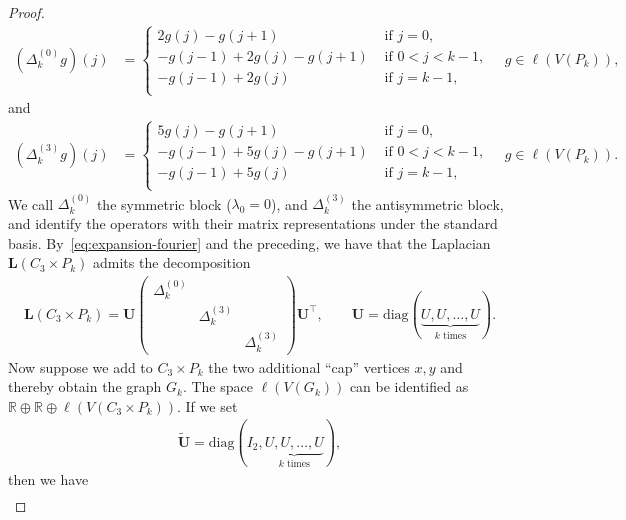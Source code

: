 \documentclass[11pt,a4paper]{amsart}
\begin{document}
\begin{proof}
\begin{align*}
            (\Delta_k^{(0)}g)(j) &= \begin{cases}
                2g(j)-g(j+1) & \text{ if }j=0,\\
                -g(j-1)+2g(j)-g(j+1) & \text{ if }0<j<k-1,\\
                -g(j-1) + 2g(j) & \text{ if }j=k-1,\\
            \end{cases}\quad g\in\ell(V(P_k)),
        \end{align*}
    and
        \begin{align}\label{eq:anti-block}
            (\Delta_k^{(3)}g)(j) &= \begin{cases}
                5g(j)-g(j+1) & \text{ if }j=0,\\
                -g(j-1)+5g(j)-g(j+1) & \text{ if }0<j<k-1,\\
                -g(j-1) + 5g(j) & \text{ if }j=k-1,\\
            \end{cases}\quad g\in\ell(V(P_k)).
        \end{align}
    We call $\Delta_k^{(0)}$ the {symmetric block} ($\lambda_0=0$), and
    $\Delta_k^{(3)}$ the {antisymmetric block}, and identify the operators with their matrix representations under the standard basis. By~\cref{eq:expansion-fourier} and the preceding, we have that the Laplacian $\mathbf{L}(C_3\times P_k)$ admits the decomposition
        \begin{align*}
            \mathbf{L}(C_3\times P_k) = \mathbf{U} \begin{pmatrix}
            \Delta_k^{(0)} & & \\
            & \Delta_k^{(3)} & \\
            & & \Delta_k^{(3)}
        \end{pmatrix} \mathbf{U}^\top,\qquad \mathbf{U} = \mathrm{diag}(\underbrace{U, U, \dotsc,  U}_{k\text{ times}}).
        \end{align*}
    Now suppose we add to $C_3\times P_k$ the two additional ``cap'' vertices $x, y$ and thereby obtain the graph $G_k$. The space $\ell(V(G_k))$ can be identified as $\mathbb{R}\oplus \mathbb{R} \oplus \ell(V(C_3\times P_k))$. If we set 
        \begin{align*}
            \widetilde{\mathbf{U}} = \mathrm{diag}(I_2, \underbrace{U, U, \dotsc,  U}_{k\text{ times}}),
        \end{align*}
    then we have
        \begin{align}\label{eq:block-decomp-L}

\end{align}
\end{proof}
\end{document}
